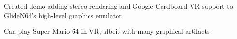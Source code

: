 \documentclass[12pt]{jmichaud-resume}
\begin{document}
\begin{minipage}[t]{11.5cm}
\sectionsep
{} \hfill
{}
\begin{tightemize}
	\item Created demo adding stereo rendering and Google Cardboard VR support to GlideN64's high-level graphics emulator
	\item Can play Super Mario 64 in VR, albeit with many graphical artifacts
\end{tightemize}

\end{minipage}
\end{document}
